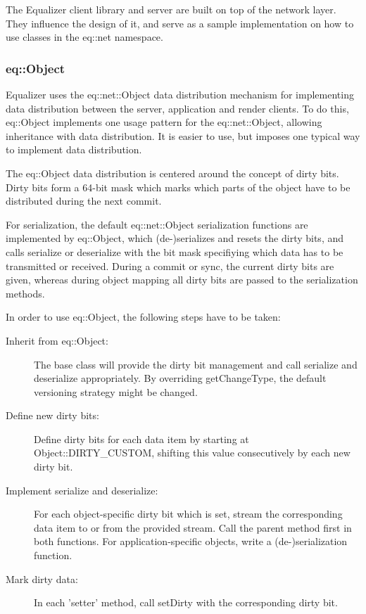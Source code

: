 \documentclass[10pt,a4]{scrartcl}
\begin{document}
The Equalizer client library and server are built on top of the network
layer. They influence the design of it, and serve as a sample
implementation on how to use classes in the \textsf{eq::net} namespace.

\subsubsection{eq::Object}

Equalizer uses the \textsf{eq::net::Object} data distribution mechanism
for implementing data distribution between the server, application and
render clients. To do this, \textsf{eq::Object} implements one usage
pattern for the \textsf{eq::net::Object}, allowing inheritance with data
distribution. It is easier to use, but imposes one typical way to implement data
distribution.

The \textsf{eq::Object} data distribution is centered around the concept
of dirty bits. Dirty bits form a 64-bit mask which marks which parts of
the object have to be distributed during the next commit.

For serialization, the default \textsf{eq::net::Object} serialization
functions are implemented by \textsf{eq::Object}, which (de-)serializes
and resets the dirty bits, and calls \textsf{serialize} or
\textsf{deserialize} with the bit mask specifiying which data has to be
transmitted or received. During a commit or sync, the current dirty bits
are given, whereas during object mapping all dirty bits are passed to
the serialization methods.

In order to use \textsf{eq::Object}, the following steps have to be
taken:

\begin{description}
\item[Inherit from \textsf{eq::Object}:] The base class will provide the
  dirty bit management and call serialize and deserialize
  appropriately. By overriding \textsf{getChangeType}, the default
  versioning strategy might be changed.
\item[Define new dirty bits:] Define dirty bits for each data item by
  starting at \textsf{Object::DIRTY\_CUSTOM}, shifting this value
  consecutively by each new dirty bit.
\item[Implement serialize and deserialize:] For each object-specific
  dirty bit which is set, stream the corresponding data item to or from
  the provided stream. Call the parent method first in both
  functions. For application-specific objects, write a (de-)serialization
  function.
\item[Mark dirty data:] In each 'setter' method, call \textsf{setDirty}
  with the corresponding dirty bit.
\end{description}
\end{document}
